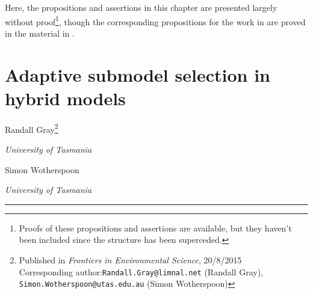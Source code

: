 Here, the propositions and assertions in this chapter are presented
largely without proof\footnote{Proofs of these propositions and
  assertions are available, but they haven't been included since the
  structure has been superceded.}, though the corresponding propositions
for the work in \Cfour are proved in the material in \Cfour.

\pagebreak
{}
\section*{Adaptive submodel selection in hybrid  models}

\begin{center}
  Randall Gray\footnote{{Published in \emph{Frontiers in Environmental Science}, 20/8/2015}\\
    Corresponding author:\texttt{Randall.Gray@limnal.net} (Randall Gray),\\
      \texttt{Simon.Wotherspoon@utas.edu.au} (Simon Wotherspoon)
      }

    \emph{University of Tasmania}

    Simon Wotherspoon 

    \emph{University of Tasmania}
\end{center}

\rule{\textwidth}{2pt}

